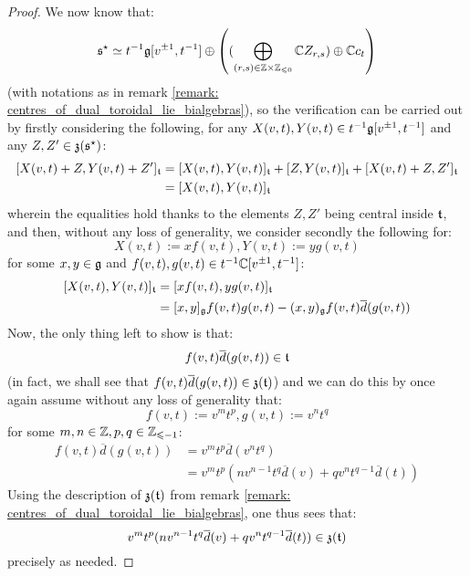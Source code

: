                 \begin{proof}
                    We now know that:
                        $$\s^{\star} \cong t^{-1}\g[v^{\pm 1}, t^{-1}] \oplus \left( ( \bigoplus_{(r, s) \in \Z \x \Z_{\leq 0}} \bbC Z_{r, s}) \oplus \bbC c_t \right)$$
                    (with notations as in remark \ref{remark: centres_of_dual_toroidal_lie_bialgebras}), so the verification can be carried out by firstly considering the following, for any $X(v, t), Y(v, t) \in t^{-1}\mathfrak{g}[v^{\pm 1}, t^{-1}]$ and any $Z, Z' \in \mathfrak{z}(\mathfrak{s}^{\star})$:
                        $$
                            \begin{aligned}
                                [ X(v, t) + Z, Y(v, t) + Z' ]_{\t} & = [ X(v, t), Y(v, t) ]_{\t} + [ Z, Y(v, t) ]_{\t} + [X(v, t) + Z, Z']_{\t}
                                \\
                                & = [ X(v, t), Y(v, t) ]_{\t}
                            \end{aligned}
                        $$
                    wherein the equalities hold thanks to the elements $Z, Z'$ being central inside $\mathfrak{t}$, and then, without any loss of generality, we consider secondly the following for:
                        $$X(v, t) := x f(v, t), Y(v, t) := y g(v, t)$$
                    for some $x, y \in \mathfrak{g}$ and $f(v, t), g(v, t) \in t^{-1}\mathbb{C}[v^{\pm 1}, t^{-1}]$:
                        $$
                            \begin{aligned}
                                [ X(v, t), Y(v, t) ]_{\t} & = [ x f(v, t), y g(v, t) ]_{\t}
                                \\
                                & = [x, y]_{\g} f(v, t) g(v, t) - (x, y)_{\g} f(v, t) \overline{d}( g(v, t) )
                            \end{aligned}
                        $$
                    Now, the only thing left to show is that:
                        $$f(v, t) \overline{d}( g(v, t) ) \in \mathfrak{t}$$
                    (in fact, we shall see that $f(v, t) \overline{d}( g(v, t) ) \in \mathfrak{z}(\mathfrak{t})$) and we can do this by once again assume without any loss of generality that:
                        $$f(v, t) := v^m t^p, g(v, t) := v^n t^q$$
                    for some $m, n \in \mathbb{Z}, p, q \in \mathbb{Z}_{\leqslant -1}$:
                        $$
                            \begin{aligned}
                                f(v, t) \overline{d}( g(v, t) ) & = v^m t^p \overline{d}( v^n t^q )
                                \\
                                & = v^m t^p ( n v^{n - 1} t^q \overline{d}(v) + q v^n t^{q - 1} \overline{d}(t) )
                            \end{aligned}
                        $$
                    Using the description of $\mathfrak{z}(\mathfrak{t})$ from remark \ref{remark: centres_of_dual_toroidal_lie_bialgebras}, one thus sees that:
                        $$v^m t^p ( n v^{n - 1} t^q \overline{d}(v) + q v^n t^{q - 1} \overline{d}(t) ) \in \mathfrak{z}(\mathfrak{t})$$
                    precisely as needed. 
                \end{proof}

